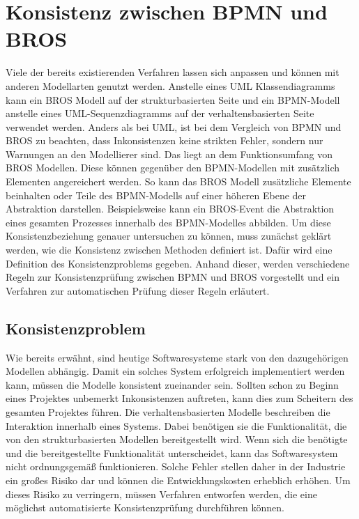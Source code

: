 \chapter{Konsistenz zwischen BPMN und BROS}
\label{chap:consistency}

Viele der bereits existierenden Verfahren lassen sich anpassen und können mit anderen Modellarten genutzt werden. 
Anstelle eines UML Klassendiagramms kann ein BROS Modell auf der strukturbasierten Seite und ein BPMN-Modell anstelle eines UML-Sequenzdiagramms auf der verhaltensbasierten Seite verwendet werden.
Anders als bei UML, ist bei dem Vergleich von BPMN und BROS zu beachten, dass Inkonsistenzen keine strikten Fehler, sondern nur Warnungen an den Modellierer sind.
Das liegt an dem Funktionsumfang von BROS Modellen.
Diese können gegenüber den BPMN-Modellen mit zusätzlich Elementen angereichert werden.
So kann das BROS Modell zusätzliche Elemente beinhalten oder Teile des BPMN-Modells auf einer höheren Ebene der Abstraktion darstellen.
Beispielsweise kann ein BROS-Event die Abstraktion eines gesamten Prozesses innerhalb des BPMN-Modelles abbilden.
Um diese Konsistenzbeziehung genauer untersuchen zu können, muss zunächst geklärt werden, wie die Konsistenz zwischen Methoden definiert ist.
Dafür wird eine Definition des Konsistenzproblems gegeben.
Anhand dieser, werden verschiedene Regeln zur Konsistenzprüfung zwischen BPMN und BROS vorgestellt und ein Verfahren zur automatischen Prüfung dieser Regeln erläutert.

\section{Konsistenzproblem}

Wie bereits erwähnt, sind heutige Softwaresysteme stark von den dazugehörigen Modellen abhängig.
Damit ein solches System erfolgreich implementiert werden kann, müssen die Modelle konsistent zueinander sein.
Sollten schon zu Beginn eines Projektes unbemerkt Inkonsistenzen auftreten, kann dies zum Scheitern des gesamten Projektes führen.
Die verhaltensbasierten Modelle beschreiben die Interaktion innerhalb eines Systems.
Dabei benötigen sie die Funktionalität, die von den strukturbasierten Modellen bereitgestellt wird.
Wenn sich die benötigte und die bereitgestellte Funktionalität unterscheidet, kann das Softwaresystem nicht ordnungsgemäß funktionieren.
Solche Fehler stellen daher in der Industrie ein großes Risiko dar und können die Entwicklungskosten erheblich erhöhen.
Um dieses Risiko zu verringern, müssen Verfahren entworfen werden, die eine möglichst automatisierte Konsistenzprüfung durchführen können.

